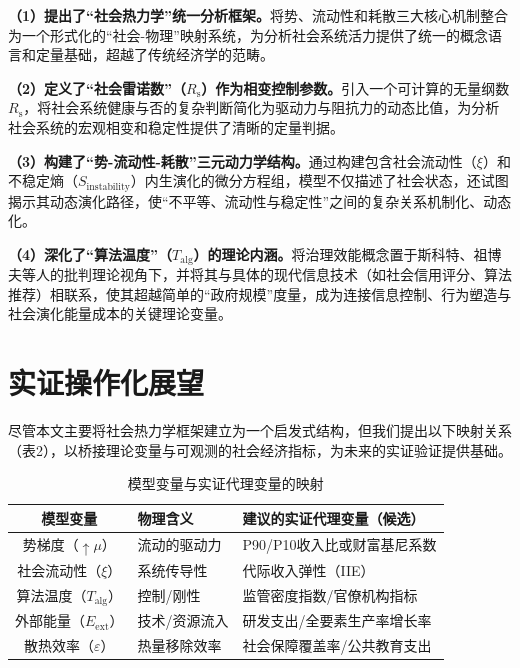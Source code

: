 \documentclass[twocolumn]{ctexart}
\newcommand{\upmu}{\uparrow\!\mu}
\newcommand{\upxi}{\xi}
\newcommand{\Sinst}{S_{\mathrm{instability}}}
\newcommand{\Talg}{T_{\mathrm{alg}}}
\newcommand{\Eext}{E_{\mathrm{ext}}}
\newcommand{\Rs}{R_{\mathrm{s}}}
\newcommand{\veps}{\varepsilon}
\begin{document}
\textbf{（1）提出了“社会热力学”统一分析框架。}将势、流动性和耗散三大核心机制整合为一个形式化的“社会-物理”映射系统，为分析社会系统活力提供了统一的概念语言和定量基础，超越了传统经济学的范畴。

\textbf{（2）定义了“社会雷诺数”（$\Rs$）作为相变控制参数。}引入一个可计算的无量纲数$\Rs$，将社会系统健康与否的复杂判断简化为驱动力与阻抗力的动态比值，为分析社会系统的宏观相变和稳定性提供了清晰的定量判据。

\textbf{（3）构建了“势-流动性-耗散”三元动力学结构。}通过构建包含社会流动性（$\upxi$）和不稳定熵（$\Sinst$）内生演化的微分方程组，模型不仅描述了社会状态，还试图揭示其动态演化路径，使“不平等、流动性与稳定性”之间的复杂关系机制化、动态化。

\textbf{（4）深化了“算法温度”（$\Talg$）的理论内涵。}将治理效能概念置于斯科特、祖博夫等人的批判理论视角下\cite{scott1998seeing,zuboff2019surveillance}，并将其与具体的现代信息技术（如社会信用评分、算法推荐）相联系，使其超越简单的“政府规模”度量\cite{zhang2002governance}，成为连接信息控制、行为塑造与社会演化能量成本的关键理论变量。

\section{实证操作化展望}

尽管本文主要将社会热力学框架建立为一个启发式结构，但我们提出以下映射关系（表2），以桥接理论变量与可观测的社会经济指标，为未来的实证验证提供基础。

\begin{table}[H]
\centering
\caption{模型变量与实证代理变量的映射}
\label{tab:proxies}
\begin{threeparttable}
\begin{tabular}{cll}
\toprule
模型变量 & 物理含义 & 建议的实证代理变量（候选） \\
\midrule
势梯度（$\upmu$） & 流动的驱动力 & P90/P10收入比或财富基尼系数 \\
社会流动性（$\upxi$） & 系统传导性 & 代际收入弹性（IIE） \\
算法温度（$\Talg$） & 控制/刚性 & 监管密度指数/官僚机构指标 \\
外部能量（$\Eext$） & 技术/资源流入 & 研发支出/全要素生产率增长率 \\
散热效率（$\veps$） & 热量移除效率 & 社会保障覆盖率/公共教育支出 \\
\bottomrule
\end{tabular}
\end{threeparttable}
\end{table}
\end{document}
